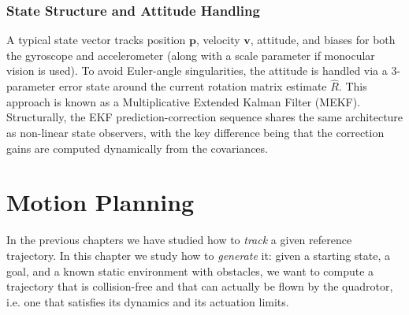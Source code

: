 \documentclass[10pt, a4paper]{report}
\begin{document}
\subsection{State Structure and Attitude Handling}
A typical state vector tracks position $\mathbf{p}$, velocity $\mathbf{v}$, attitude, and biases for both the gyroscope and accelerometer (along with a scale parameter if monocular vision is used). 
To avoid Euler-angle singularities, the attitude is handled via a 3-parameter error state around the current rotation matrix estimate $\hat{R}$. This approach is known as a Multiplicative Extended Kalman Filter (MEKF). 
Structurally, the EKF prediction-correction sequence shares the same architecture as non-linear state observers, with the key difference being that the correction gains are computed dynamically from the covariances.
\chapter{Motion Planning}\label{ch:motion_planning}
In the previous chapters we have studied how to \textit{track} a given reference trajectory. In this chapter we study how to \textit{generate} it: given a starting state, a goal, and a known static environment with obstacles, we want to compute a trajectory that is collision-free and that can actually be flown by the quadrotor, i.e. one that satisfies its dynamics and its actuation limits.
\end{document}
